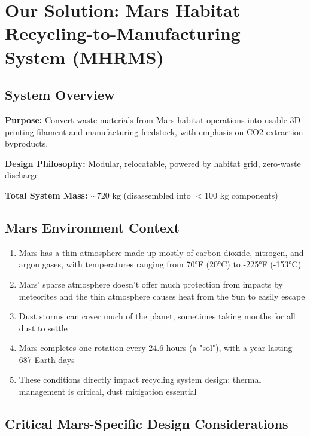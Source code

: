 \documentclass[12pt, a4paper]{article}
\begin{document}
\section{Our Solution: Mars Habitat Recycling-to-Manufacturing System (MHRMS)}

\subsection{System Overview}
\textbf{Purpose:} Convert waste materials from Mars habitat operations into usable 3D printing filament and manufacturing feedstock, with emphasis on CO2 extraction byproducts.

\textbf{Design Philosophy:} Modular, relocatable, powered by habitat grid, zero-waste discharge

\textbf{Total System Mass:} $\sim$720 kg (disassembled into $<$100 kg components)

\subsection{Mars Environment Context}
\begin{enumerate}
    \item Mars has a thin atmosphere made up mostly of carbon dioxide, nitrogen, and argon gases, with temperatures ranging from 70°F (20°C) to -225°F (-153°C)
    \item Mars' sparse atmosphere doesn't offer much protection from impacts by meteorites and the thin atmosphere causes heat from the Sun to easily escape
    \item Dust storms can cover much of the planet, sometimes taking months for all dust to settle
    \item Mars completes one rotation every 24.6 hours (a "sol"), with a year lasting 687 Earth days
    \item These conditions directly impact recycling system design: thermal management is critical, dust mitigation essential
\end{enumerate}

\subsection{Critical Mars-Specific Design Considerations}
\end{document}
